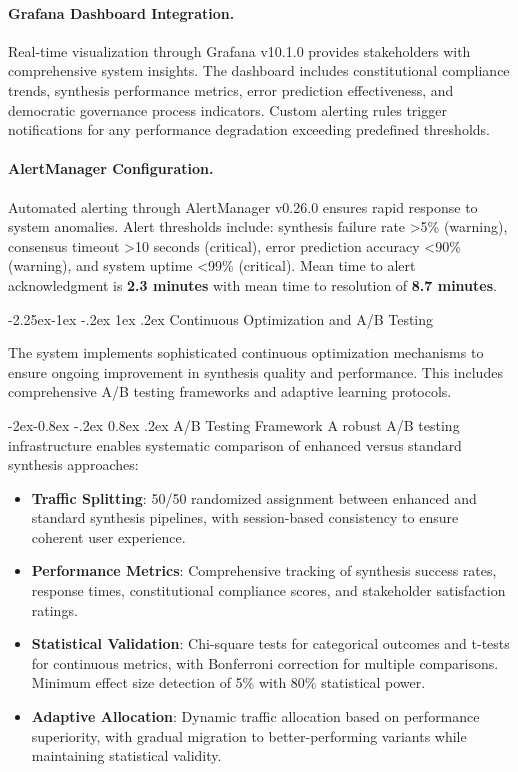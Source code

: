 \documentclass[manuscript,screen,9pt]{acmart}
\makeatletter
\renewcommand\subsection{\@startsection{subsection}{2}{\z@}%
  {-2.25ex\@plus -1ex \@minus -.2ex}%
  {1ex \@plus .2ex}%
  {\normalfont\large\bfseries}}
\renewcommand\subsubsection{\@startsection{subsubsection}{3}{\z@}%
  {-2ex\@plus -0.8ex \@minus -.2ex}%
  {0.8ex \@plus .2ex}%
  {\normalfont\normalsize\bfseries}}
\makeatother
\begin{document}
\paragraph{Grafana Dashboard Integration.} Real-time visualization through Grafana v10.1.0 provides stakeholders with comprehensive system insights. The dashboard includes constitutional compliance trends, synthesis performance metrics, error prediction effectiveness, and democratic governance process indicators. Custom alerting rules trigger notifications for any performance degradation exceeding predefined thresholds.

\paragraph{AlertManager Configuration.} Automated alerting through AlertManager v0.26.0 ensures rapid response to system anomalies. Alert thresholds include: synthesis failure rate >5\% (warning), consensus timeout >10 seconds (critical), error prediction accuracy <90\% (warning), and system uptime <99\% (critical). Mean time to alert acknowledgment is \textbf{2.3 minutes} with mean time to resolution of \textbf{8.7 minutes}.

\subsection{Continuous Optimization and A/B Testing}
\label{subsec:continuous_optimization}

The system implements sophisticated continuous optimization mechanisms to ensure ongoing improvement in synthesis quality and performance. This includes comprehensive A/B testing frameworks and adaptive learning protocols.

\subsubsection{A/B Testing Framework}
A robust A/B testing infrastructure enables systematic comparison of enhanced versus standard synthesis approaches:

\begin{itemize}[leftmargin=*,itemsep=1pt,parsep=1pt]
    \item \textbf{Traffic Splitting}: 50/50 randomized assignment between enhanced and standard synthesis pipelines, with session-based consistency to ensure coherent user experience.
    \item \textbf{Performance Metrics}: Comprehensive tracking of synthesis success rates, response times, constitutional compliance scores, and stakeholder satisfaction ratings.
    \item \textbf{Statistical Validation}: Chi-square tests for categorical outcomes and t-tests for continuous metrics, with Bonferroni correction for multiple comparisons. Minimum effect size detection of 5\% with 80\% statistical power.
    \item \textbf{Adaptive Allocation}: Dynamic traffic allocation based on performance superiority, with gradual migration to better-performing variants while maintaining statistical validity.
\end{itemize}
\end{document}
